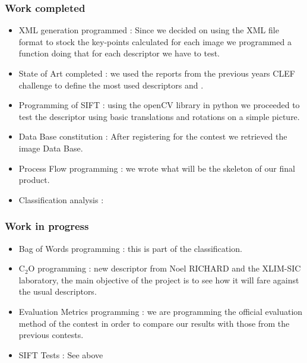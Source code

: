 \documentclass[12pt]{article}
\begin{document}
\subsubsection*{Work completed}
\begin{itemize}
  \item XML generation programmed : Since we decided on using the XML file format to stock the key-points calculated for each image we programmed a function doing that for each descriptor we have to test.
  \item State of Art completed : we used the reports from the previous years CLEF challenge to define the most used descriptors and .
  \item Programming of SIFT : using the openCV library in python we proceeded to test the descriptor using basic translations and rotations on a simple picture.
  \item Data Base constitution : After registering for the contest we retrieved the image Data Base.
  \item Process Flow programming : we wrote what will be the skeleton of our final product.
  \item Classification analysis :
\end{itemize}

\subsubsection*{Work in progress}
\begin{itemize}
  \item Bag of Words programming : this is part of the classification.
  \item C$_2$O programming : new descriptor from Noel RICHARD and the XLIM-SIC laboratory, the main objective of the project is to see how it will fare against the usual descriptors.
  \item Evaluation Metrics programming : we are programming the official evaluation method of the contest in order to compare our results with those from the previous contests.
  \item SIFT Tests : See above
\end{itemize}
\end{document}
